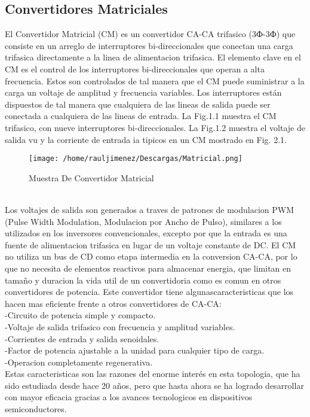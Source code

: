 \documentclass[11pt]{article}
\begin{document}
\subsection{Convertidores Matriciales}
El  Convertidor  Matricial  (CM)  es  un  convertidor  CA-CA  trifasico  (3Ф-3Ф) que  consiste  en  un  arreglo  de  interruptores  bi-direccionales  que  conectan  una  carga trifasica directamente a la linea de alimentacion trifasica. El  elemento  clave  en  el  CM  es  el  control  de  los  interruptores  bi-direccionales que operan a alta frecuencia. Estos son controlados de tal manera que  el  CM  puede  suministrar  a  la  carga  un  voltaje  de  amplitud  y  frecuencia  variables.  Los  interruptores  están  dispuestos  de  tal  manera  que  cualquiera  de  las lineas de salida puede ser conectada a cualquiera  de  las  lineas  de  entrada.  La  Fig.1.1  muestra  el  CM  trifasico,  con  nueve  interruptores  bi-direccionales.  La  Fig.1.2  muestra  el  voltaje  de  salida  vu  y  la  corriente  de  entrada  ia  tipicos  en  un  CM mostrado en Fig. 2.1.\\
\begin{figure}[htp]
\centering
\texttt{[image: /home/rauljimenez/Descargas/Matricial.png]}
\caption{Muestra De Convertidor Matricial}
\label{}
\end{figure}\\
Los voltajes de salida son generados a traves de patrones de modulacion PWM (Pulse Width Modulation, Modulacion por Ancho de Pulso), similares a los utilizados  en  los  inversores  convencionales,  excepto  por  que  la  entrada  es  una  fuente de alimentacion trifasica en lugar de un voltaje constante de DC. El  CM  no  utiliza  un  bus  de  CD  como  etapa  intermedia  en  la  conversion  CA-CA, por lo que no necesita de elementos reactivos para almacenar energia, que limitan en tamaño y duracion la vida util de un convertidoria como es comun en    otros    convertidores    de    potencia.    Este    convertidor    tiene    algunascaracteristicas  que  los  hacen  mas  eficiente  frente  a  otros  convertidores  de  CA-CA:\\ -Circuito de potencia simple y compacto.\\ -Voltaje de salida trifasico con frecuencia y amplitud variables.\\ -Corrientes de entrada y salida senoidales.\\ -Factor de potencia ajustable a la unidad para cualquier tipo de carga.\\ -Operacion completamente regenerativa.\\ Estas   caracteristicas   son   las   razones   del   enorme   interés   en   esta   topologia, que ha sido estudiada desde hace 20 años, pero que hasta ahora se ha logrado desarrollar con mayor eficacia gracias a los avances tecnologicos en dispositivos semiconductores.
\end{document}
